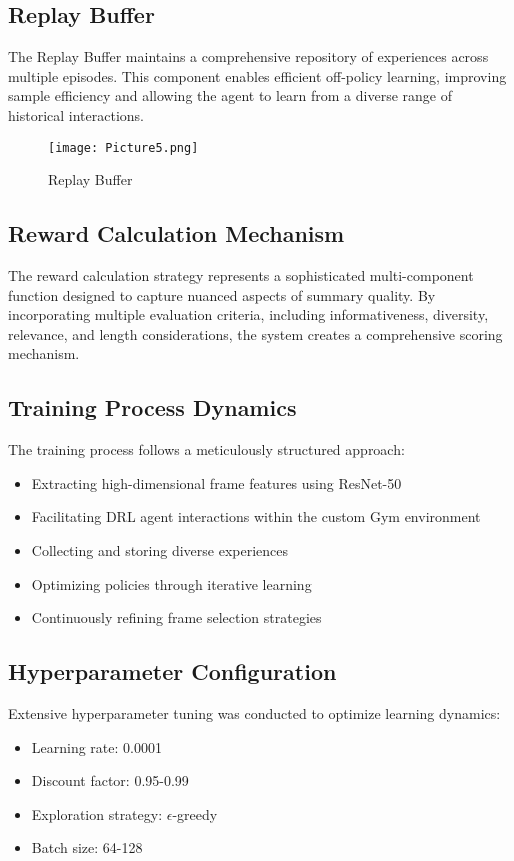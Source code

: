 \documentclass[conference]{IEEEtran}
\begin{document}
\subsection{\textbf{Replay Buffer}}
The Replay Buffer maintains a comprehensive repository of experiences across multiple episodes. This component enables efficient off-policy learning, improving sample efficiency and allowing the agent to learn from a diverse range of historical interactions.

\begin{figure}[htbp]
\centerline{\texttt{[image: Picture5.png]}}
\caption{Replay Buffer}
\label{fig}
\end{figure}

\subsection{\textbf{Reward Calculation Mechanism}}
The reward calculation strategy represents a sophisticated multi-component function designed to capture nuanced aspects of summary quality. By incorporating multiple evaluation criteria, including informativeness, diversity, relevance, and length considerations, the system creates a comprehensive scoring mechanism.

\subsection{\textbf{Training Process Dynamics}}
The training process follows a meticulously structured approach:
\begin{itemize}
\item Extracting high-dimensional frame features using ResNet-50
\item Facilitating DRL agent interactions within the custom Gym environment
\item Collecting and storing diverse experiences
\item Optimizing policies through iterative learning
\item Continuously refining frame selection strategies
\end{itemize}

\subsection{\textbf{Hyperparameter Configuration}}
Extensive hyperparameter tuning was conducted to optimize learning dynamics:
\begin{itemize}
\item Learning rate: 0.0001
\item Discount factor: 0.95-0.99
\item Exploration strategy: \(\epsilon\)-greedy
\item Batch size: 64-128
\end{itemize}
\end{document}
